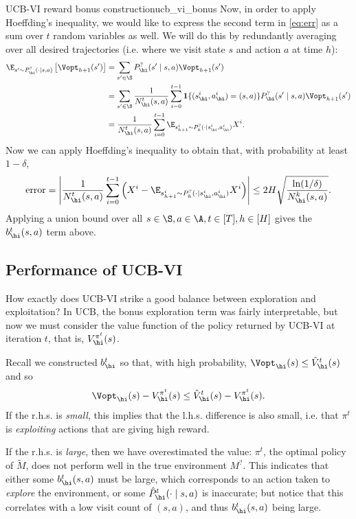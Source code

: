 \documentclass[\main/main]{subfiles}
\begin{document}
\begin{derivation}{UCB-VI reward bonus construction}{ucb_vi_bonus}
    Now, in order to apply Hoeffding's inequality, we would like to express the second term in \eqref{eq:err} as a sum over $t$ random variables as well. We will do this by redundantly averaging over all desired trajectories (i.e. where we visit state $s$ and action $a$ at time $h$):
    \begin{align*}
        \E_{s' \sim P^?_\hi(\cdot \mid s, a)} \left[ \Vopt_{h+1}(s') \right]
        &= \sum_{s' \in \S} P^?_\hi(s' \mid s, a) \Vopt_{h+1}(s') \\
        &= \sum_{s' \in \S} \frac{1}{N^t_\hi(s, a)} \sum_{i=0}^{t-1} \mathbf{1}\{ (s_\hi^i, a_\hi^i) = (s, a) \} P^?_\hi(s' \mid s, a) \Vopt_{h+1}(s') \\
        &= \frac{1}{N^t_\hi(s, a)} \sum_{i=0}^{t-1} \E_{s_{h+1}^i \sim P^?_{h}(\cdot \mid s_\hi^i, a_\hi^i)} X^i.
    \end{align*}
    Now we can apply Hoeffding's inequality to obtain that, with probability at least $1-\delta$,
    \[
        \text{error} = \left| \frac{1}{N^t_\hi(s, a)} \sum_{i=0}^{t-1} \left(X^i - \E_{s_{h+1}^i \sim P^?_{h}(\cdot \mid s_\hi^i, a_\hi^i)} X^i \right) \right| \le 2 H \sqrt{\frac{\ln(1/\delta)}{N_\hi^k(s, a)}}.
    \]
    Applying a union bound over all $s \in \S, a \in \A, t \in [T], h \in [H]$ gives the $b_\hi^t(s, a)$ term above.
\end{derivation}

\subsection{Performance of UCB-VI}

How exactly does UCB-VI strike a good balance between exploration and exploitation? In UCB, the bonus exploration term was fairly interpretable, but now we must consider the value function of the policy returned by UCB-VI at iteration $t$, that is, $V^{\pi^t}_\hi(s)$.

Recall we constructed $b^t_\hi$ so that, with high probability, $\Vopt_\hi(s) \le \hat{V}_\hi^t(s)$ and so \[
    \Vopt_\hi(s) - V^{\pi^t}_\hi(s) \le \hat{V}_\hi^t(s) - V^{\pi^t}_\hi(s).
\]
If the r.h.s. is \emph{small}, this implies that the l.h.s. difference is also small, i.e. that $\pi^t$ is \emph{exploiting} actions that are giving high reward.

If the r.h.s. is \emph{large}, then we have overestimated the value: $\pi^t$, the optimal policy of $\tilde{M}$, does not perform well in the true environment $M^?$. This indicates that either some $b_\hi^t(s, a)$ must be large, which corresponds to an action taken to \emph{explore} the environment, or some $\hat P^t_\hi(\cdot \mid s, a)$ is inaccurate; but notice that this correlates with a low visit count of $(s, a)$, and thus $b_\hi^t(s, a)$ being large.
\end{document}
